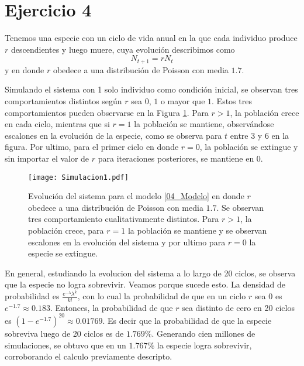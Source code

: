 \section*{Ejercicio 4}
\graphicspath{{Figuras/ej_04/}}

Tenemos una especie con un ciclo de vida anual en la que cada individuo produce $r$ descendientes y luego muere, cuya evolución describimos como
\begin{equation}
    N_{t+1} = r N_{t}
    \label{04_Modelo}
\end{equation}
y en donde $r$ obedece a una distribución de Poisson con media $1.7$.

Simulando el sistema con 1 solo individuo como condición inicial, se observan tres comportamientos distintos según $r$ sea $0$, $1$ o mayor que $1$. Estos tres comportamientos pueden observarse en la Figura \ref{04_Simulacion}. Para $r>1$, la población crece en cada ciclo, mientras que si $r=1$ la población se mantiene, observándose escalones en la evolución de la especie, como se observa para $t$ entre 3 y 6 en la figura. Por ultimo, para el primer ciclo en donde $r=0$, la población se extingue y sin importar el valor de $r$ para iteraciones posteriores, se mantiene en $0$. 

\begin{figure}
    \centering
    \texttt{[image: Simulacion1.pdf]}
    \caption{Evolución del sistema para el modelo \ref{04_Modelo} en donde $r$ obedece a una distribución de Poisson con media $1.7$. Se observan tres comportamiento cualitativamente distintos. Para $r>1$, la población crece, para $r=1$ la población se mantiene y se observan escalones en la evolución del sistema y por ultimo para $r=0$ la especie se extingue.}
    \label{04_Simulacion}
\end{figure}

En general, estudiando la evolucion del sistema a lo largo de 20 ciclos, se observa que la especie no logra sobrevivir. Veamos porque sucede esto. La densidad de probabilidad es $\frac{e^{-\lambda}\lambda^{k}}{k!}$, con lo cual la probabilidad de que en un ciclo $r$ sea $0$ es $e^{-1.7}\approx0.183$. Entonces, la probabilidad de que $r$ sea distinto de cero en 20 ciclos es $(1-e^{-1.7})^{20}\approx0.01769$. Es decir que la probabilidad de que la especie sobreviva luego de 20 ciclos es de $1.769\%$. Generando cien millones de simulaciones, se obtuvo que en un $1.767\%$ la especie logra sobrevivir, corroborando el calculo previamente descripto. 